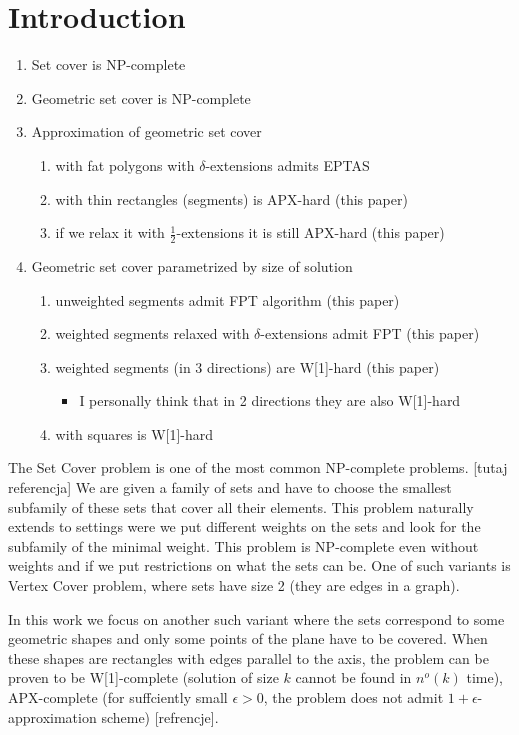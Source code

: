 \chapter{Introduction}

\begin{enumerate}
\item Set cover is NP-complete
\item Geometric set cover is NP-complete
\item Approximation of geometric set cover
	\begin{enumerate}
		\item with fat polygons with $\delta$-extensions admits EPTAS
		\item with thin rectangles (segments) is APX-hard (this paper)
		\item if we relax it with $\frac{1}{2}$-extensions it is still APX-hard (this paper)
	\end{enumerate}
\item Geometric set cover parametrized by size of solution
	\begin{enumerate}
		\item unweighted segments admit FPT algorithm (this paper)
		\item weighted segments relaxed with $\delta$-extensions admit FPT (this paper)
		\item weighted segments (in 3 directions) are W[1]-hard (this paper)
		\begin{itemize}
			\item I personally think that in 2 directions they are also W[1]-hard
		\end{itemize}
		\item with squares is W[1]-hard
	\end{enumerate}
\end{enumerate}

The Set Cover problem is one of the most common NP-complete problems.
[tutaj referencja]
We are given a family of sets and have to choose the smallest
subfamily of these sets that cover all their elements.
This problem naturally extends to settings
were we put different weights on the sets
and look for the subfamily of the minimal weight.
This problem is NP-complete even 
without weights and if we put
restrictions on what the sets can be.
One of such variants is Vertex Cover problem,
where sets have size 2 (they are edges in a graph).

In this work we focus on another such variant where the sets correspond
to some geometric shapes and
only some points of the plane have to be covered.
When these shapes are rectangles with edges parallel
to the axis, the problem can be proven to
be W[1]-complete (solution of size $k$ cannot be found
in $n^o(k)$ time),
APX-complete (for suffciently small $\epsilon > 0$, the problem
does not admit $1+\epsilon$-approximation scheme)
[refrencje].

